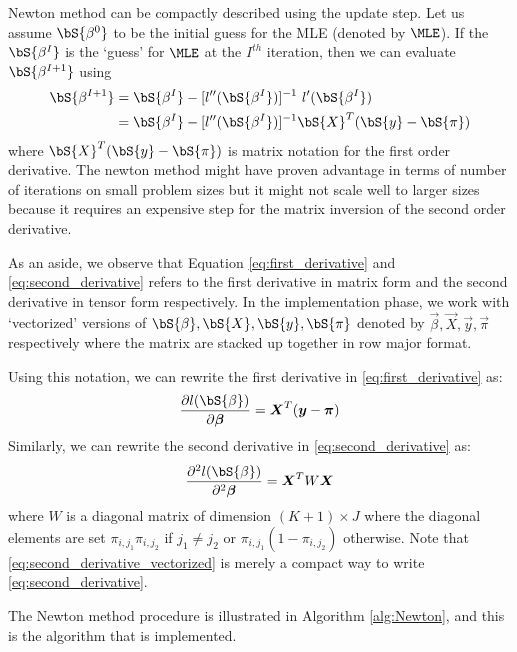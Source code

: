 Newton method can be compactly described using the update step. Let us assume $\bS{\beta^0}$ to be the initial guess for the MLE (denoted by $\MLE$). If the $\bS{\beta^I}$ is the `guess' for $\MLE$ at the $I^{th}$ iteration, then we can evaluate $\bS{\beta^{I+1}}$ using
\begin{align}\label{eq:update}
\bS{\beta^{I+1}} &= \bS{\beta^{I}} - [l''(\bS{\beta^{I}})]^{-1}  \ l'(\bS{\beta^{I}}) \\
&= \bS{\beta^{I}} - [l''(\bS{\beta^{I}})]^{-1}  \bS{X}^{T} (\bS{y} - \bS{\pi}) 
\end{align}
where $\bS{X}^{T} (\bS{y} - \bS{\pi})$ is matrix notation for the first order derivative.
The newton method might have proven advantage in terms of number of iterations on small problem sizes but it might not scale well to larger sizes because it requires an expensive step for the matrix inversion of the second order derivative. 

As an aside, we observe that Equation \eqref{eq:first_derivative} and \eqref{eq:second_derivative} refers to the first derivative in matrix form and the second derivative in tensor form respectively. In the implementation phase, we work with `vectorized' versions of $\bS{\beta},\bS{X},\bS{y}, \bS{\pi}$ denoted by $\vec{\beta},\vec{X},\vec{y}, \vec{\pi}$ respectively where the matrix are stacked up together in row major format.  

Using this notation, we can rewrite the first derivative in \eqref{eq:first_derivative} as:
\begin{equation}\label{eq:first_derivative_vectorized}
\frac{\partial l(\bS{\beta})}{\partial \vec{\beta}} = \vec{X}^{T} (\vec{y} - \vec{\pi}) 
\end{equation}
Similarly, we can rewrite the second derivative in  \eqref{eq:second_derivative} as:
\begin{equation}\label{eq:second_derivative_vectorized}
\frac{\partial^2 l(\bS{\beta})}{\partial^2 \vec{\beta}} = \vec{X}^{T} W \vec{X}
\end{equation}
where $W$ is a diagonal matrix of dimension $(K+1) \times J $ where the diagonal elements are set $\pi_{i,j_1}\pi_{i,j_2}$ if $j_1 \neq j_2$ or $\pi_{i,j_1}(1-\pi_{i,j_2})$ otherwise. Note that \eqref{eq:second_derivative_vectorized} is merely a compact way to write \eqref{eq:second_derivative}. 

The Newton method procedure is illustrated in Algorithm \ref{alg:Newton}, and this is the algorithm that is implemented.  

